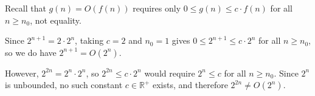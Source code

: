 Recall that $g(n) = O(f(n))$ requires only $0 \leq g(n) \leq c \cdot f(n)$ for
all $n \geq n_0$, not equality.

Since $2^{n + 1} = 2 \cdot 2^n$, taking $c = 2$ and $n_0 = 1$ gives
$0 \leq 2^{n+1} \leq c \cdot 2^n$ for all $n \geq n_0$, so we do have
$2^{n + 1} = O(2^n)$.

However, $2^{2n} = 2^n \cdot 2^n$, so $2^{2n} \leq c \cdot 2^n$ would require
$2^n \leq c$ for all $n \geq n_0$. Since $2^n$ is unbounded, no such constant
$c \in \mathbb{R}^+$ exists, and therefore $2^{2n} \neq O(2^n)$.
